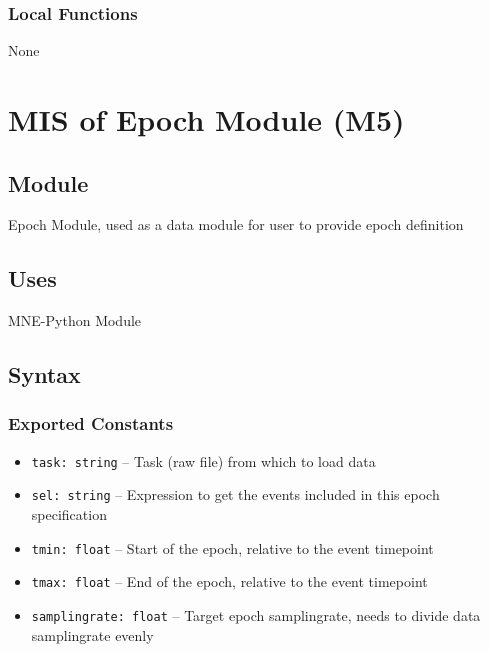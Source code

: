 \documentclass[12pt, titlepage]{article}
\begin{document}
\subsubsection{Local Functions}


None


\newpage








\section{MIS of Epoch Module (M5)}




\subsection{Module}


Epoch Module, used as a data module for user to provide epoch definition




\subsection{Uses}


MNE-Python Module




\subsection{Syntax}


\subsubsection{Exported Constants}


\begin{itemize}
    \item \lstinline|task: string| -- Task (raw file) from which to load data
    \item \lstinline|sel: string| -- Expression to get the events included in this epoch specification
    \item \lstinline|tmin: float| -- Start of the epoch, relative to the event timepoint
    \item \lstinline|tmax: float| -- End of the epoch, relative to the event timepoint
    \item \lstinline|samplingrate: float| -- Target epoch samplingrate, needs to divide data samplingrate evenly
\end{itemize}
\end{document}

